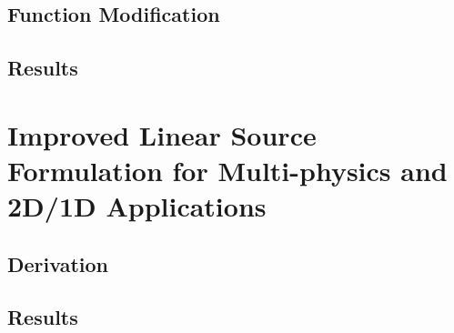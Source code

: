 {{    \subsection{Function Modification}{\label{ssec:LSMOC:ET:Function Modification}
      \blindtext[5]
    }
    \subsection{Results}{\label{ssec:LSMOC:ET:Results}
      \blindtext[5]
    }
  }
  \section{Improved Linear Source Formulation for Multi-physics and 2D/1D Applications}{\label{sec:Improved Linear Source Formulation for Multi-physics and 2D/1D Applications}
    \blindtext
    \subsection{Derivation}{\label{ssec:LSMOC:Derivation}
      \blindtext[5]
    }
    \subsection{Results}{\label{ssec:LSMOC:Results}
      \blindtext[5]
    }
  }
}


